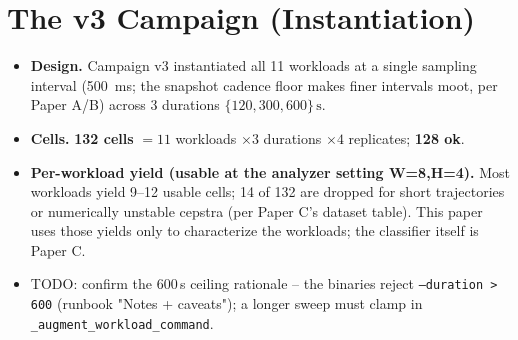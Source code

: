 \documentclass[conference]{IEEEtran}
\begin{document}
\section{The v3 Campaign (Instantiation)}
\label{sec:campaign}
\begin{itemize}
  \item \textbf{Design.} Campaign v3 instantiated all 11 workloads at a single
        sampling interval (\SI{500}{\milli\second}; the snapshot cadence floor
        makes finer intervals moot, per Paper A/B) across 3 durations
        $\{120, 300, 600\}\,\si{\second}$.
  \item \textbf{Cells.} \textbf{132 cells} $= 11$ workloads $\times 3$ durations
        $\times 4$ replicates; \textbf{128 ok}.
  \item \textbf{Per-workload yield (usable at the analyzer setting W=8,H=4).}
        Most workloads yield 9--12 usable cells; 14 of 132 are dropped for short
        trajectories or numerically unstable cepstra (per Paper C's dataset
        table). This paper uses those yields only to characterize the workloads;
        the classifier itself is Paper C.
  \item TODO: confirm the 600\,s ceiling rationale -- the binaries reject
        \texttt{--duration > 600} (runbook "Notes + caveats"); a longer sweep
        must clamp in \texttt{\_augment\_workload\_command}.
\end{itemize}

\end{document}

